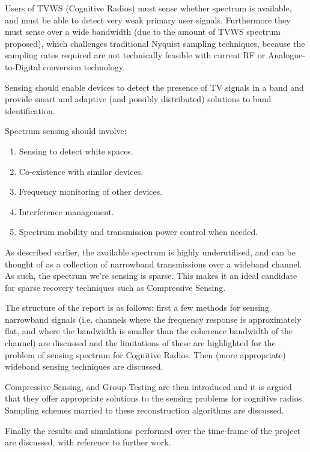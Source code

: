 Users of TVWS (Cognitive Radios) must sense whether spectrum is available, and must be able to detect very weak primary user signals. Furthermore they must sense over a wide bandwidth (due to the amount of TVWS spectrum proposed), which challenges traditional Nyquist sampling techniques, because the sampling rates required are not technically feasible with current RF or Analogue-to-Digital conversion technology.

Sensing should enable devices to detect the presence of TV signals in a band and provide smart and adaptive (and possibly distributed) solutions to band identification.

Spectrum sensing should involve:

\begin{enumerate}
\item Sensing to detect white spaces.
\item Co-existence with similar devices.
\item Frequency monitoring of other devices.
\item Interference management. 
\item Spectrum mobility and transmission power control when needed.
\end{enumerate}

As described earlier, the available spectrum is highly underutilised, and can be thought of as a collection of narrowband transmissions over a wideband channel. As such, the spectrum we're sensing is sparse. This makes it an ideal candidate for sparse recovery techniques such as Compressive Sensing.  

The structure of the report is as follows: first a few methods for sensing narrowband signals (i.e. channels where the frequency response is approximately flat, and where the bandwidth is smaller than the coherence bandwidth of the channel) are discussed and the limitations of these are highlighted for the problem of sensing spectrum for Cognitive Radios. Then (more appropriate) wideband sensing techniques are discussed. 

Compressive Sensing, and Group Testing are then introduced and it is argued that they offer appropriate solutions to the sensing problems for cognitive radios. Sampling schemes married to these reconstruction algorithms are discussed. 

Finally the results and simulations performed over the time-frame of the project are discussed, with reference to further work. 
